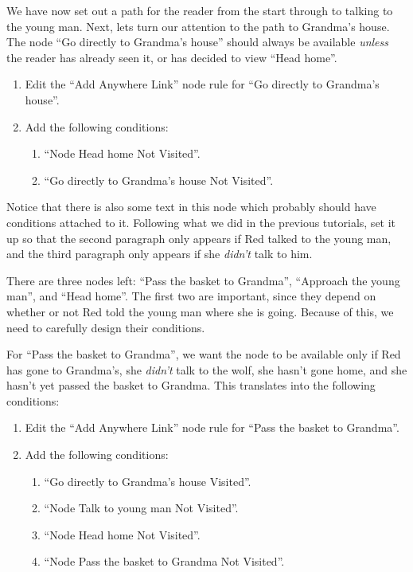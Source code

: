 \documentclass{article}
\begin{document}
We have now set out a path for the reader from the start through to talking to
the young man. Next, lets turn our attention to the path to Grandma's house.
The node ``Go directly to Grandma's house'' should always be available
\textit{unless} the reader has already seen it, or has decided to view ``Head
home''.

\begin{enumerate}
  \item Edit the ``Add Anywhere Link'' node rule for ``Go directly to Grandma's
  house''.
  \item Add the following conditions: 
  \begin{enumerate}
  \item ``Node Head home Not Visited''.
  \item ``Go directly to Grandma's house Not Visited''.
\end{enumerate}
\end{enumerate}

Notice that there is also some text in this node which probably should have
conditions attached to it. Following what we did in the previous tutorials, set
it up so that the second paragraph only appears if Red talked to the young man,
and the third paragraph only appears if she \textit{didn't} talk to him.

There are three nodes left: ``Pass the basket to Grandma'', ``Approach the
young man'', and ``Head home''. The first two are important, since they depend
on whether or not Red told the young man where she is going. Because of this,
we need to carefully design their conditions.

For ``Pass the basket to Grandma'', we want the node to be available only if
Red has gone to Grandma's, she \textit{didn't} talk to the wolf, she hasn't gone
home, and she hasn't yet passed the basket to Grandma. This translates into the
following conditions:

\begin{enumerate}
  \item Edit the ``Add Anywhere Link'' node rule for ``Pass the basket to
  Grandma''.
  \item Add the following conditions:
  \begin{enumerate}
  \item ``Go directly to Grandma's house Visited''.
  \item ``Node Talk to young man Not Visited''.
  \item ``Node Head home Not Visited''.
  \item ``Node Pass the basket to Grandma Not Visited''.
\end{enumerate}
\end{enumerate}
\end{document}
